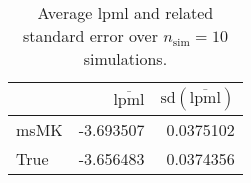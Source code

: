 \begin{table}[H]

\caption{Average lpml and related standard error over $n_{\text{sim}} = 10$ simulations.}
\centering
\begin{tabular}[t]{lrr}
\toprule
  & $\overbar{\text{lpml}}$ & $\text{sd}(\overbar{\text{lpml}})$\\
\midrule
msMK & -3.693507 & 0.0375102\\
True & -3.656483 & 0.0374356\\
\bottomrule
\end{tabular}
\end{table}